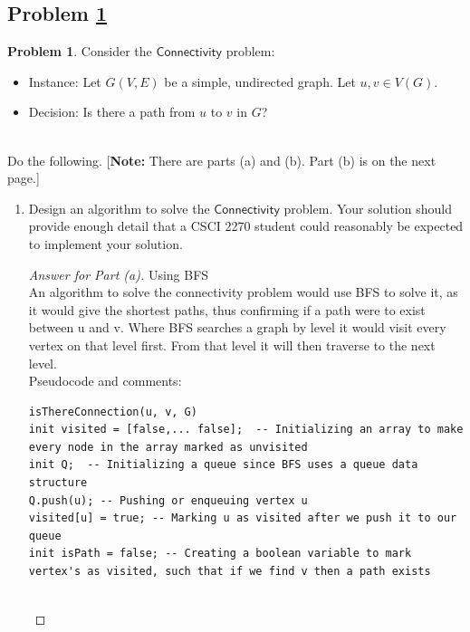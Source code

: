 \documentclass[11pt]{article}
\theoremstyle{definition}
\theoremstyle{definition}
\newtheorem{required}{Problem}
\theoremstyle{definition}
\begin{document}
\subsection{Problem \ref{DFS1}}
\begin{required} \label{DFS1}
Consider the $\textsf{Connectivity}$ problem:
\begin{itemize}
\item \textsf{Instance:} Let $G(V, E)$ be a simple, undirected graph. Let $u, v \in V(G)$.
\item \textsf{Decision:} Is there a path from $u$ to $v$ in $G$?
\end{itemize}

\noindent \\ Do the following. [\textbf{Note:} There are parts (a) and (b). Part (b) is on the next page.]
\begin{enumerate}[label=(\alph*)]
\item Design an algorithm to solve the $\textsf{Connectivity}$ problem. Your solution should provide enough detail that a CSCI 2270 student could reasonably be expected to implement your solution.
\begin{proof}[Answer for Part (a)] Using BFS \\
An algorithm to solve the connectivity problem would use BFS to solve it, as it would give the shortest paths, thus confirming if a path were to exist between u and v. Where BFS searches a graph by level it would visit every vertex on that level first. From that level it will then traverse to the next level. \\

Pseudocode and comments: \\
\begin{center}
\begin{lstlisting}
isThereConnection(u, v, G) 
init visited = [false,... false];  -- Initializing an array to make every node in the array marked as unvisited 
init Q;  -- Initializing a queue since BFS uses a queue data structure 
Q.push(u); -- Pushing or enqueuing vertex u 
visited[u] = true; -- Marking u as visited after we push it to our queue
init isPath = false; -- Creating a boolean variable to mark vertex's as visited, such that if we find v then a path exists 


\end{lstlisting}
\end{center}
\end{proof}
\end{enumerate}
\end{required}
\end{document}
